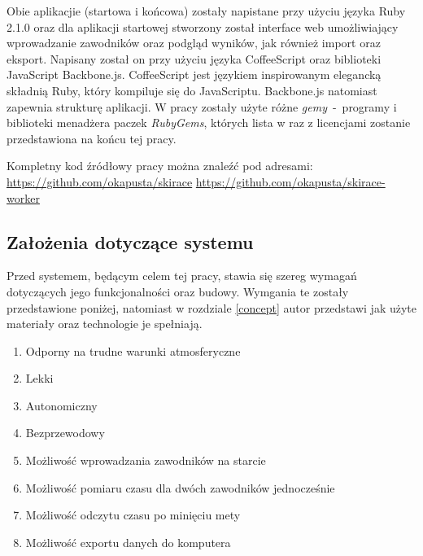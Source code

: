 \documentclass[11pt,a4paper, twoside]{article}
\begin{document}
Obie aplikacjie (startowa i końcowa) zostały napistane przy użyciu języka Ruby 2.1.0 oraz dla aplikacji startowej stworzony został interface web umożliwiający wprowadzanie zawodników oraz podgląd wyników, jak również import oraz eksport. Napisany został on przy użyciu języka CoffeeScript oraz biblioteki JavaScript Backbone.js. 
CoffeeScript jest językiem inspirowanym elegancką składnią Ruby, który kompiluje się do JavaScriptu. Backbone.js natomiast zapewnia strukturę aplikacji.
\newline
\newline
\noindent
W pracy zostały użyte różne \emph{gemy}~-~programy i biblioteki menadżera paczek \emph{RubyGems}, których lista w raz z licencjami zostanie przedstawiona na końcu tej pracy.
\newline

\noindent
Kompletny kod źródłowy pracy można znaleźć pod adresami:
\newline
\url{https://github.com/okapusta/skirace}
\newline
\url{https://github.com/okapusta/skirace-worker}

\newpage

\newpage
\noindent
\subsection{Założenia dotyczące systemu}
Przed systemem, będącym celem tej pracy, stawia się szereg wymagań dotyczących jego funkcjonalności oraz budowy. Wymgania te zostały przedstawione poniżej, natomiast w rozdziale \ref{concept} autor przedstawi jak użyte materiały oraz technologie je spełniają.
\begin{enumerate}
\item Odporny na trudne warunki atmosferyczne
\item Lekki
\item Autonomiczny
\item Bezprzewodowy
\item \label{req:entry} Możliwość wprowadzania zawodników na starcie
\item \label{req:two} Możliwość pomiaru czasu dla dwóch zawodników jednocześnie
\item \label{req:lcd} Możliwość odczytu czasu po minięciu mety 
\item \label{req:export} Możliwość exportu danych do komputera
\end{enumerate}
\newpage
\end{document}
